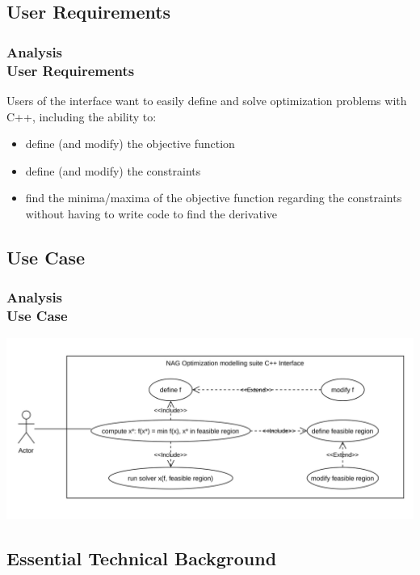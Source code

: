 \documentclass[ucs,10pt]{beamer}
\begin{document}
\subsection{User Requirements}

\begin{frame}
\frametitle{Analysis \\
\small \color{rwth-blue} User Requirements}
Users of the interface want to easily define and solve optimization problems with C++, including the ability to: 
\begin{itemize}
\item define (and modify) the objective function
\item define (and modify) the constraints
\item find the minima/maxima of the objective function regarding the constraints without having to write code to find the derivative
\end{itemize}

\end{frame}

\subsection{Use Case}

\begin{frame}
\frametitle{Analysis \\
\small \color{rwth-blue} Use Case}
\includegraphics[width=\textwidth]{use case.pdf}
\end{frame}


\subsection{Essential Technical Background}
\end{document}
